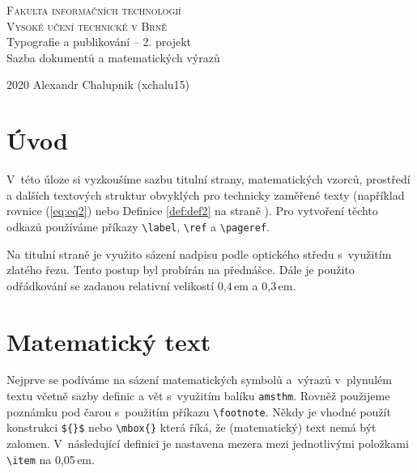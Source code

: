 \documentclass[11pt, a4paper,twocolumn]{article}
\begin{document}
\begin{titlepage}
    \begin{center}
        \Huge
        \textsc{Fakulta informačních technologií}\\[0.4em]
        \textsc{Vysoké učení technické v Brně}\\
        \LARGE{Typografie a publikování -- 2. projekt\\
        Sazba dokumentů a matematických výrazů}\\[0.3em]
    \end{center}
    {\Large 2020 \hfill Alexandr Chalupnik (xchalu15)}
\end{titlepage}

\section*{Úvod} 
V~této úloze si vyzkoušíme sazbu titulní strany, matematických vzorců, prostředí a dalších textových struktur obvyklých pro technicky zaměřené texty (například rovnice (\ref{eq:eq2}) nebo Definice \ref{def:def2} na straně \pageref{eq:eq1}). Pro vytvoření těchto odkazů používáme příkazy \verb|\label|, \verb|\ref| a \verb|\pageref|. 

Na titulní straně je využito sázení nadpisu podle optického středu s~využitím zlatého řezu. Tento postup byl probírán na přednášce. Dále je použito odřádkování se zadanou relativní velikostí 0{,}4\,em a 0{,}3\,em.

\section{Matematický text}
Nejprve se podíváme na sázení matematických symbolů a~výrazů v~plynulém textu včetně sazby definic a vět s~využitím balíku \verb|amsthm|. Rovněž použijeme poznámku pod čarou s~použitím příkazu \verb|\footnote|. Někdy je vhodné použít konstrukci \verb|${}$| nebo \verb|\mbox{}| která říká, že (matematický) text nemá být zalomen. V~následující definici je nastavena mezera mezi jednotlivými položkami \verb|\item| na 0,05\,em.
\end{document}
